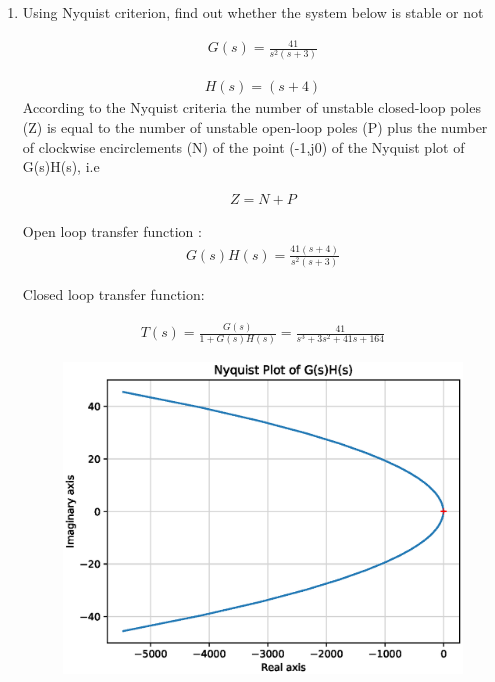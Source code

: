 \begin{enumerate}[label=\thesection.\arabic*.,ref=\thesection.\theenumi]
\item Using Nyquist criterion, find out whether the system below is stable or not

\begin{align}
    G(s)= \frac{41}{s^2(s+3)}
    \label{eq:ee18btech11041_1}
\end{align}

\begin{align}
    H(s)= (s+4)
    \label{eq:ee18btech11041_2}
\end{align}
\solution 
According to the Nyquist criteria the number of unstable closed-loop poles (Z) is equal to the number of unstable open-loop poles (P) plus the number of clockwise encirclements (N) of the point (-1,j0) of the Nyquist plot of G(s)H(s), i.e

\begin{align}
    Z=N+P
    \label{eq:ee18btech11041_3}
\end{align}

Open loop transfer function :
\begin{align}
    G(s)H(s)=\frac{41(s+4)}{s^2(s+3)}
    \label{eq:ee18btech11041_4}
\end{align}

Closed loop transfer function:

\begin{align}
   T(s)= \frac{G(s)}{1+G(s)H(s)}=\frac{41}{s^3+3s^2+41s+164}
\end{align}

\begin{figure}[!h]
    \includegraphics[width=\columnwidth]{./figs/ee18btech11041_1.eps}
    \caption{}
    \label{fig:ee18btech11041_fig1}
\end{figure}


\end{enumerate}
